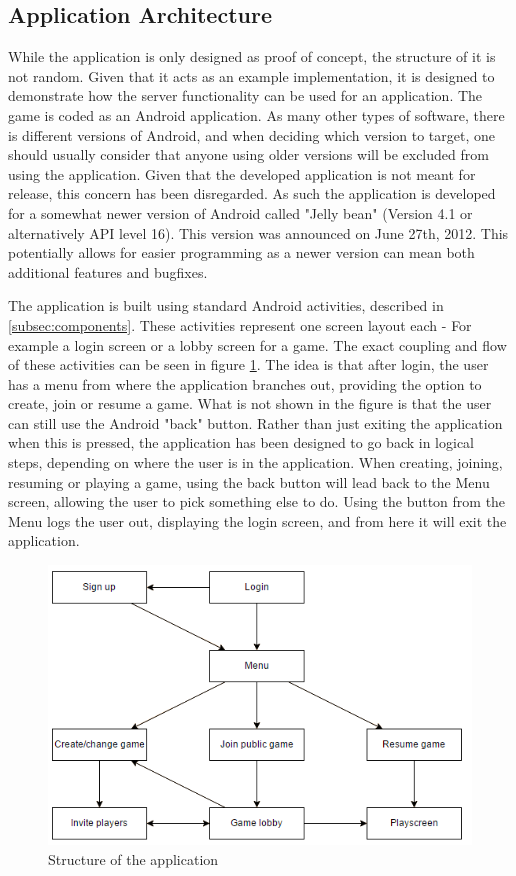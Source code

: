 \subsection{Application Architecture} \label{sec:application_architecture}
While the application is only designed as proof of concept, the structure of it is not random. Given that it acts as an example implementation, it is designed to demonstrate how the server functionality can be used for an application. The game is coded as an Android application. As many other types of software, there is different versions of Android, and when deciding which version to target, one should usually consider that anyone using older versions will be excluded from using the application. Given that the developed application is not meant for release, this concern has been disregarded. As such the application is developed for a somewhat newer version of Android called "Jelly bean" (Version 4.1 or alternatively API level 16). This version was announced on June 27th, 2012\cite{jelly-bean}. This potentially allows for easier programming as a newer version can mean both additional features and bugfixes.

The application is built using standard Android activities, described in \ref{subsec:components}. These activities represent one screen layout each - For example a login screen or a lobby screen for a game. The exact coupling and flow of these activities can be seen in figure \ref{fig:appstructure}. The idea is that after login, the user has a menu from where the application branches out, providing the option to create, join or resume a game.
What is not shown in the figure is that the user can still use the Android "back" button. Rather than just exiting the application when this is pressed, the application has been designed to go back in logical steps, depending on where the user is in the application. When creating, joining, resuming or playing a game, using the back button will lead back to the Menu screen, allowing the user to pick something else to do. Using the button from the Menu logs the user out, displaying the login screen, and from here it will exit the application.

\begin{figure}[H]
\centering
\includegraphics[width=\textwidth]{billeder/appstructure.png}
\caption{Structure of the application}
\label{fig:appstructure}
\end{figure}

